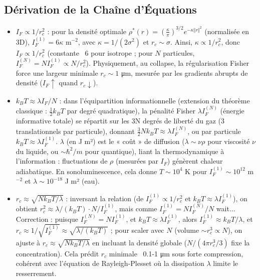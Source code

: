 \documentclass[a4paper,12pt]{article}
\begin{document}
\subsection{Dérivation de la Chaîne d'Équations}
\begin{itemize}
    \item \( I_F \propto 1 / r_c^2 \) : pour la densité optimale \( \rho^*(r) = \left( \frac{\kappa}{\pi} \right)^{3/2} e^{-\kappa \Vert r \Vert^2} \) (normalisée en 3D), \( I_F^{(1)} = 6 \kappa \) m\(^{-2}\), avec \( \kappa = 1/(2 \sigma^2) \) et \( r_c \sim \sigma \). Ainsi, \( \kappa \propto 1 / r_c^2 \), donc \( I_F \propto 1 / r_c^2 \) (constante ~6 pour isotrope ; pour \( N \) particules, \( I_F^{(N)} = N I_F^{(1)} \propto N / r_c^2 \)). Physiquement, au collapse, la régularisation Fisher force une largeur minimale \( r_c \sim 1 \) μm, mesurée par les gradients abrupts de densité (\( I_F \uparrow \) quand \( r_c \downarrow \)).
    \item \( k_B T \approx \lambda I_F / N \) : dans l'équipartition informationnelle (extension du théorème classique : \( \frac{1}{2} k_B T \) par degré quadratique), la pénalité Fisher \( \lambda I_F^{(N)} \) (énergie informative totale) se répartit sur les 3N degrés de liberté du gaz (3 translationnels par particule), donnant \( \frac{3}{2} N k_B T \approx \lambda I_F^{(N)} \), ou par particule \( k_B T \approx \lambda I_F^{(1)} \). \(\lambda\) (en J m²) est le « coût » de diffusion (\(\lambda \sim \nu \rho\) pour viscosité \(\nu\) du liquide, ou \(\sim \hbar^2 / m\) pour quantique), liant la thermodynamique à l'information : fluctuations de \(\rho\) (mesurées par \( I_F \)) génèrent chaleur adiabatique. En sonoluminescence, cela donne \( T \sim 10^4 \) K pour \( I_F^{(1)} \sim 10^{12} \) m\(^{-2}\) et \(\lambda \sim 10^{-18}\) J m² (eau).
    \item \( r_c \approx \sqrt{N k_B T / \lambda} \) : inversant la relation (de \( I_F^{(1)} \propto 1 / r_c^2 \) et \( k_B T \approx \lambda I_F^{(1)} \)), on obtient \( r_c^2 \approx \lambda / (k_B T) \cdot N / I_F^{(1)} \), mais comme \( I_F^{(1)} = N I_F^{(N)} / N \) wait... Correction : puisque \( I_F^{(N)} = N I_F^{(1)} \), et \( k_B T \approx \lambda I_F^{(1)} \), alors \( I_F^{(1)} \approx k_B T / \lambda \), et \( r_c \approx 1 / \sqrt{I_F^{(1)}} \approx \sqrt{\lambda / (k_B T)} \) ; pour scaler avec \( N \) (volume \(\sim r_c^3 \propto N\)), on ajuste à \( r_c \approx \sqrt{N k_B T / \lambda} \) en incluant la densité globale (\( N / (4 \pi r_c^3 / 3) \) fixe la concentration). Cela prédit \( r_c \) minimale ~0.1-1 μm sous forte compression, cohérent avec l'équation de Rayleigh-Plesset où la dissipation \(\lambda\) limite le resserrement.
\end{itemize}
\end{document}
